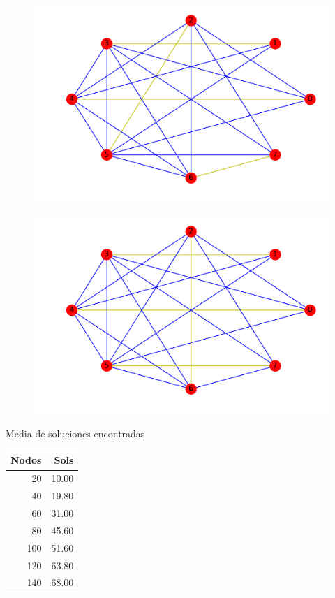 \documentclass{beamer}
\begin{document}
\begin{frame}
\begin{figure}[h!]
\centering
\includegraphics[scale=0.5]{opt3}
\end{figure}
\end{frame}

\begin{frame}
\begin{figure}[h!]
\centering
\includegraphics[scale=0.5]{opt4}
\end{figure}
\end{frame}


\begin{frame}{Media de soluciones encontradas}
\begin{table}[ht]
\centering
\begin{tabular}{rr}
  \hline
  Nodos & Sols \\ 
  \hline
20 & 10.00 \\ 
40 & 19.80 \\ 
60 & 31.00 \\ 
80 & 45.60 \\ 
100 & 51.60 \\ 
120 & 63.80 \\ 
140 & 68.00 \\ 
   \hline
\end{tabular}
\end{table}
\end{frame}
\end{document}
